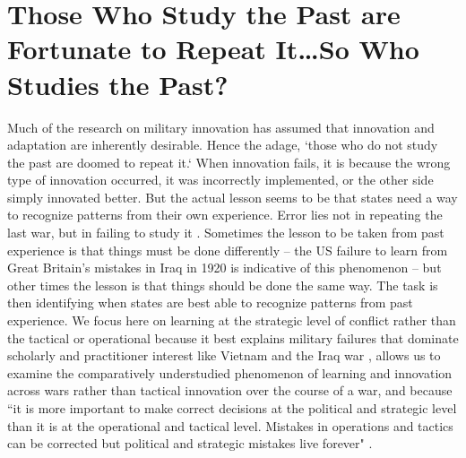 \documentclass[12pt,letterpaper]{article}
\begin{document}
\section{Those Who Study the Past are Fortunate to Repeat It\ldots So Who Studies the Past?}
	Much of the research on military innovation has assumed that innovation and adaptation are inherently desirable. Hence the adage, `those who do not study the past are doomed to repeat it.` When innovation fails, it is because the wrong type of innovation occurred, it was incorrectly implemented, or the other side simply innovated better. But the actual lesson seems to be that states need a way to recognize patterns from their own experience. Error lies not in repeating the last war, but in failing to study it \citep[4.1]{murray_militaryadaptationwar_2009}. Sometimes the lesson to be taken from past experience is that things must be done differently -- the US failure to learn from Great Britain's mistakes in Iraq in 1920 is indicative of this phenomenon \citep{haldane_insurrectionmesopotamia1920_1922} -- but other times the lesson is that things should be done the same way. The task is then identifying when states are best able to recognize patterns from past experience. We focus here on learning at the strategic level of conflict rather than the tactical or operational because it best explains military failures that dominate scholarly and practitioner interest like Vietnam \citep{mcmaster_derelictiondutyjohnson_1998} and the Iraq war \citep{fallows_blindbaghdadamerica_2006}, allows us to examine the comparatively understudied phenomenon of learning and innovation across wars rather than tactical innovation over the course of a war, and because ``it is more important to make correct decisions at the political and strategic level than it is at the operational and tactical level. Mistakes in operations and tactics can be corrected but political and strategic mistakes live forever" \citep{millett_lessonswar_1988}.
\end{document}
